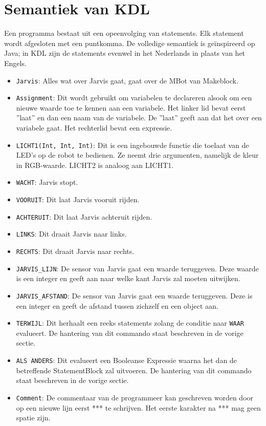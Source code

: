 \documentclass[a4paper]{article}
\begin{document}
\section{Semantiek van KDL}
Een programma bestaat uit een opeenvolging van statements. Elk statement wordt afgesloten met een puntkomma. De volledige semantiek is geïnspireerd op Java; in KDL zijn de statements evenwel in het Nederlands in plaats van het Engels.

\begin{itemize}
	\item \verb|Jarvis|: Alles wat over Jarvis gaat, gaat over de MBot van Makeblock.
	\item \verb|Assignment|: Dit wordt gebruikt om variabelen te declareren alsook om een nieuwe waarde toe te kennen aan een variabele. Het linker lid bevat eerst ''laat''  en dan een naam van de variabele. De ''laat'' geeft aan dat het over een variabele gaat. Het rechterlid bevat een expressie.
	\item \verb|LICHT1(Int, Int, Int)|: Dit is een ingebouwde functie die toelaat van de LED's op de robot te bedienen. Ze neemt drie argumenten, namelijk de kleur in RGB-waarde. LICHT2 is analoog aan LICHT1.
	\item \verb|WACHT|: Jarvis stopt.
	\item \verb|VOORUIT|: Dit laat Jarvis vooruit rijden.
	\item \verb|ACHTERUIT|: Dit laat Jarvis achteruit rijden.
	\item \verb|LINKS|: Dit draait Jarvis naar links.
	\item \verb|RECHTS|: Dit draait Jarvis naar rechts.
	\item \verb|JARVIS_LIJN|: De sensor van Jarvis gaat een waarde teruggeven. Deze waarde is een integer en geeft aan naar welke kant Jarvis zal moeten uitwijken.
	\item \verb|JARVIS_AFSTAND|: De sensor van Jarvis gaat een waarde teruggeven. Deze is een integer en geeft de afstand tussen zichzelf en een object aan.
	\item \verb|TERWIJL|: Dit herhaalt een reeks statements zolang de conditie naar \verb|WAAR| evalueert. De hantering van dit commando staat beschreven in de vorige sectie.
	\item \verb|ALS ANDERS|: Dit evalueert een Booleanse Expressie waarna het dan de betreffende StatementBlock zal uitvoeren. De hantering van dit commando staat beschreven in de vorige sectie.
	\item \verb|Comment|: De commentaar van de programmeer kan geschreven worden door op een nieuwe lijn eerst *** te schrijven. Het eerste karakter na *** mag geen spatie zijn.
	
\end{itemize}
\end{document}
